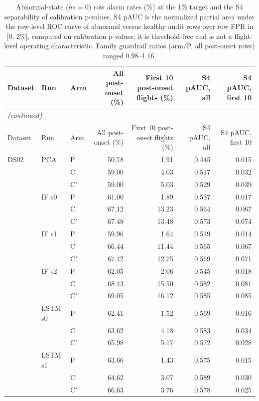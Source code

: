 \begin{scriptsize}
\begin{longtable}{lllrrrr}
\caption{Abnormal-state ($hs = 0$) row alarm rates (\%) at the 1\% target and the S4 separability of calibration p-values. S4 pAUC is the normalized partial area under the row-level ROC curve of abnormal versus healthy audit rows over row FPR in [0, 2\%], computed on calibration p-values; it is threshold-free and is not a flight-level operating characteristic. Family guardrail ratios (arm/P, all post-onset rows) ranged 0.98--1.16.}\label{tab:s16_abnormal}\\
\toprule
Dataset & Run & Arm & All post-onset (\%) & First 10 post-onset flights (\%) & S4 pAUC, all & S4 pAUC, first 10 \\
\midrule
\endfirsthead
\multicolumn{7}{l}{\emph{(continued)}}\\
\toprule
Dataset & Run & Arm & All post-onset (\%) & First 10 post-onset flights (\%) & S4 pAUC, all & S4 pAUC, first 10 \\
\midrule
\endhead
\bottomrule
\endfoot
DS02 & PCA & P & 50.78 & 1.91 & 0.445 & 0.015 \\
 &  & C & 59.00 & 4.03 & 0.517 & 0.032 \\
 &  & C$'$ & 59.00 & 5.03 & 0.529 & 0.039 \\
 & IF s0 & P & 61.00 & 1.89 & 0.537 & 0.017 \\
 &  & C & 67.12 & 13.23 & 0.564 & 0.067 \\
 &  & C$'$ & 67.48 & 13.48 & 0.573 & 0.074 \\
 & IF s1 & P & 59.96 & 1.64 & 0.519 & 0.014 \\
 &  & C & 66.44 & 11.44 & 0.565 & 0.067 \\
 &  & C$'$ & 67.42 & 12.75 & 0.569 & 0.071 \\
 & IF s2 & P & 62.05 & 2.06 & 0.545 & 0.018 \\
 &  & C & 68.43 & 15.50 & 0.582 & 0.081 \\
 &  & C$'$ & 69.05 & 16.12 & 0.585 & 0.085 \\
 & LSTM s0 & P & 62.41 & 1.52 & 0.569 & 0.016 \\
 &  & C & 63.62 & 4.18 & 0.583 & 0.034 \\
 &  & C$'$ & 65.98 & 5.17 & 0.572 & 0.028 \\
 & LSTM s1 & P & 63.66 & 1.43 & 0.575 & 0.015 \\
 &  & C & 64.62 & 3.07 & 0.589 & 0.030 \\
 &  & C$'$ & 66.63 & 3.76 & 0.578 & 0.025 \\

\end{longtable}
\end{scriptsize}
